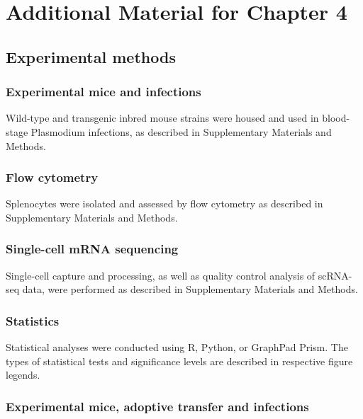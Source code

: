 
\chapter{Additional Material for Chapter 4}

\graphicspath{{Appendix3/Figs/}}

\section{Experimental methods}

\subsection{Experimental mice and infections}

Wild-type and transgenic inbred mouse strains were housed and used in blood-stage Plasmodium infections, as described in Supplementary Materials and Methods.

\subsection{Flow cytometry}

Splenocytes were isolated and assessed by flow cytometry as described in Supplementary Materials and Methods.

\subsection{Single-cell mRNA sequencing}

Single-cell capture and processing, as well as quality control analysis of scRNA-seq data, were performed as described in Supplementary Materials and Methods.

\subsection{Statistics}

Statistical analyses were conducted using R, Python, or GraphPad Prism. The types of statistical tests and significance levels are described in respective figure legends.

\subsection{Experimental mice, adoptive transfer and infections}

